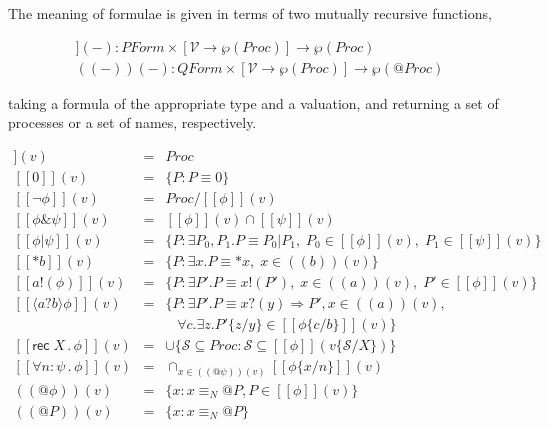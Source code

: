 \documentclass[]{amsart}
\makeatletter
\newcommand{\ldb}{[\![}
\newcommand{\rdb}{]\!]}
\newcommand{\ldrb}{(\!(}
\newcommand{\rdrb}{)\!)}
\newcommand{\id}[1]{\texttt{#1}}
\newcommand{\pzero}{\mathbin{0}}
\newcommand{\juxtap}{\mathbin{\id{|}}}
\newcommand{\concat}{\Rightarrow}
\newcommand{\scong}{\mathbin{\equiv}}
\newcommand{\nameeq}{\mathbin{\equiv_N}}
\newcommand{\binpar}[2]{#1 \juxtap #2}
\newcommand{\prefix}[3]{#1 ? ( #2 ) \concat #3}
\newcommand{\lift}[2]{#1 ! ( #2 )}
\newcommand{\quotep}[1]{@#1}
\newcommand{\dropn}[1]{*#1}
\newcommand{\substn}[2]{\id{\{} #1 / #2 \id{\}}}
\newcommand{\pmeaningof}[1]{\ldb #1 \rdb}
\newcommand{\nmeaningof}[1]{\ldrb #1 \rdrb}
\newcommand{\Proc}{\mathbin{Proc}}
\newcommand{\QProc}{\quotep{\mathbin{Proc}}}
\newcommand{\ptrue}{\mathbin{true}}
\newcommand{\pdropf}[1]{* #1}
\newcommand{\plift}[2]{#1 ! ( #2 )}
\newcommand{\pprefix}[3]{\langle #1 ? #2 \rangle #3}
\newcommand{\pgfp}[2]{\textsf{rec} \; #1 \mathbin{.} #2}
\newcommand{\pquant}[3]{\forall #1 \mathbin{:} #2 \mathbin{.} #3}
\newcommand{\PFormula}{\mathbin{PForm}}
\newcommand{\QFormula}{\mathbin{QForm}}
\newcommand{\PropVar}{\mathbin{\mathcal{V}}}
\theoremstyle{definition}
\theoremstyle{remark}
\numberwithin{equation}{subsection}
\makeatother
\begin{document}
The meaning of formulae is given in terms of two mutually recursive functions,

\begin{eqnarray}
\pmeaningof{ - }( - ) : \PFormula \times [\PropVar \to \wp(\Proc)] \to \wp(\Proc) \nonumber\\
\nmeaningof{ - }( - ) : \QFormula \times [\PropVar \to \wp(\Proc)] \to \wp(\QProc) \nonumber
\end{eqnarray}

\noindent taking a formula of the appropriate type and a valuation, and
returning a set of processes or a set of names, respectively.

\begin{eqnarray}
  \pmeaningof{\ptrue}(v) & = & \Proc \nonumber \\ 
  \pmeaningof{\pzero}(v) & = & \{ P : P \scong \pzero \} \nonumber \\ 
  \pmeaningof{\neg \phi}(v) & = & \Proc / \pmeaningof{\phi}(v) \nonumber\\
  \pmeaningof{\phi \& \psi}(v) & = & \pmeaningof{\phi}(v) \cap \pmeaningof{\psi}(v) \nonumber\\
  \pmeaningof{\binpar{\phi}{\psi}}(v) & = &
  \{ P : \exists P_0, P_1.P \scong \binpar{P_0}{P_1}, \; P_0 \in \pmeaningof{\phi}(v), \;  P_1 \in \pmeaningof{\psi}(v) \} \nonumber\\
  \pmeaningof{\pdropf{b}}(v) & = & \{ P : \exists x.P \scong {\dropn{x}}, \; x \in \nmeaningof{b}(v) \} \nonumber\\	
  \pmeaningof{\plift{a}{\phi}}(v) & = & \{ P : \exists P'.P \scong {\lift{x}{P'}},
                                           \; x \in \nmeaningof{a}(v), 
                                           \; P' \in \pmeaningof{\phi}(v) \} \nonumber\\
  \pmeaningof{\pprefix{a}{b}{\phi}}(v) & = & \{ P : \exists P'.P \scong {\prefix{x}{y}{P'}}, x \in \nmeaningof{a}(v), \nonumber\\
                                   &   &            \; \; \; \forall c . \exists z . {P'}\substn{z}{y} \in \pmeaningof{{\phi}\substn{c}{b}}(v) \} \nonumber\\
  \pmeaningof{\pgfp{X}{\phi}}(v) & = & \cup \{ \mathcal{S} \subseteq \Proc : \mathcal{S} \subseteq \pmeaningof{\phi}(v\substn{\mathcal{S}}{X})\} \nonumber\\
  \pmeaningof{\pquant{n}{\psi}{\phi}}(v) & = & \cap_{x \in \nmeaningof{\quotep{\psi}}(v)} \pmeaningof{{\phi}\substn{x}{n}}(v) \nonumber\\
  \nmeaningof{\quotep{\phi}}(v) & = & \{ x : x \nameeq \quotep{P}, P \in \pmeaningof{\phi}(v) \} \nonumber\\
  \nmeaningof{\quotep{P}}(v) & = & \{ x : x \nameeq  \quotep{P} \} \nonumber
\end{eqnarray}
\end{document}
